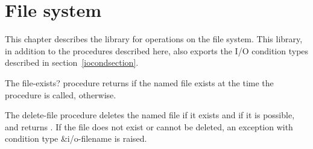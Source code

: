 \chapter{File system}
\label{filesystemchapter}

This chapter describes the  library for
operations on the file system.  This library, in addition to the
procedures described here, also exports the I/O condition types
described in section~\ref{iocondsection}.

\begin{entry}{%
}

  The {\cf file-exists?} procedure
returns \schtrue{} if the named file exists at the time the procedure
is called, \schfalse{} otherwise.
\end{entry}

\begin{entry}{%
}

  The {\cf delete-file} procedure
deletes the named file if it exists and if it is possible, and returns
\unspecifiedreturn.  If the file does not exist or cannot be deleted,
an exception with condition type {\cf\&i/o-filename} is raised.
\end{entry}


